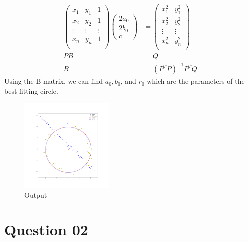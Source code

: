 \documentclass[a4paper]{article}
\begin{document}
    \begin{align*}
      \begin{pmatrix}
        x_1 & y_1 & 1\\
        x_2 & y_2 & 1\\
        \vdots & \vdots & \vdots\\
        x_n & y_n & 1\\
      \end{pmatrix}
      \begin{pmatrix}
        2a_0 \\ 2b_0 \\ c
      \end{pmatrix}&=
      \begin{pmatrix}
        x_1^2 & y_1^2\\
        x_2^2 & y_2^2\\
        \vdots & \vdots \\
        x_n^2 & y_n^2\\
      \end{pmatrix}\\
      PB&=Q\\
      B&=(P^T P)^{-1}P^T Q
    \end{align*}
    Using the B matrix, we can find
     $a_0, b_0$, and $r_0$ which are the parameters of the best-fitting
      circle.
\begin{figure}[!htb]
  \centering
  \includegraphics[width=0.4\textwidth]{images/ransac.png}
  \caption{Output}
  \label{ransac}
\end{figure}
\section*{Question 02}
\end{document}
